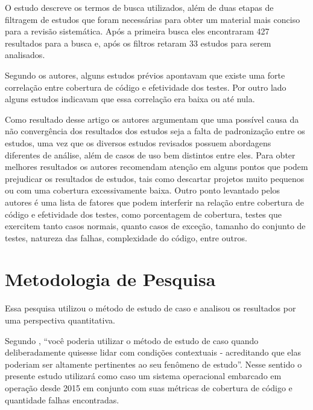 \documentclass[11.5pt]{article}
\begin{document}
O estudo descreve os termos de busca utilizados, além de duas etapas de filtragem de estudos que
foram necessárias para obter um material mais conciso para a revisão sistemática.
Após a primeira busca eles encontraram 427 resultados para a busca e, após os filtros retaram 33
estudos para serem analisados.

Segundo os autores, alguns estudos prévios apontavam que existe uma forte correlação entre cobertura
de código e efetividade dos testes.
Por outro lado alguns estudos indicavam que essa correlação era baixa ou até nula.

Como resultado desse artigo os autores argumentam que uma possível causa da não convergência dos
resultados dos estudos seja a falta de padronização entre os estudos, uma vez que os diversos
estudos revisados possuem abordagens diferentes de análise, além de casos de uso bem distintos entre
eles.
Para obter melhores resultados os autores recomendam atenção em alguns pontos que podem prejudicar
os resultados de estudos, tais como descartar projetos muito pequenos ou com uma cobertura
excessivamente baixa.
Outro ponto levantado pelos autores é uma lista de fatores que podem interferir na relação entre
cobertura de código e efetividade dos testes, como porcentagem de cobertura, testes que exercitem
tanto casos normais, quanto casos de exceção, tamanho do conjunto de testes, natureza das falhas,
complexidade do código, entre outros.




\section{Metodologia de Pesquisa}

Essa pesquisa utilizou o método de estudo de caso e analisou os resultados por uma perspectiva
quantitativa.

Segundo \cite{estudoDeCasoYin}, ``você poderia utilizar o método de estudo de caso quando
deliberadamente quisesse lidar com condições contextuais - acreditando que elas poderiam ser
altamente pertinentes ao seu fenômeno de estudo''.
Nesse sentido o presente estudo utilizará como caso um sistema operacional embarcado em operação
desde 2015 em conjunto com suas métricas de cobertura de código e quantidade falhas encontradas.
\end{document}
